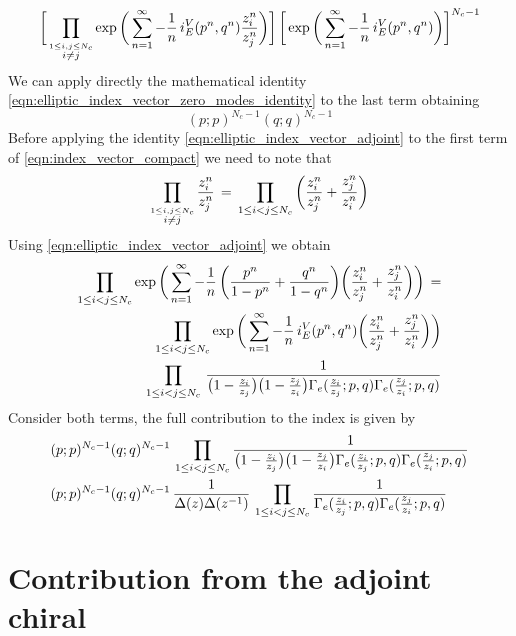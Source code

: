 \begin{appendices}
\begin{equation}
\bigg[\prod_{\overset{ 1 \leq i,j \leq N_c}{i\neq j}} \exp \bigg( \sum_{n=1}^{\infty} - {1 \over n} \, i_E^V(p^n,q^n)  {z_i^n \over z_j^n}\bigg) \bigg] \,
\bigg[ \exp \bigg( \sum_{n=1}^{\infty} - {1 \over n} \,  i_E^V(p^n,q^n) \bigg) \bigg] ^{N_c-1}
\label{eqn:index_vector_compact}
\end{equation}
We can apply directly the mathematical identity \eqref{eqn:elliptic_index_vector_zero_modes_identity} to the last term obtaining
$$
	(p;p)^{N_c-1} ( q;q)^{N_c-1}
$$
Before applying the identity \eqref{eqn:elliptic_index_vector_adjoint} to the first term of  \eqref{eqn:index_vector_compact} we need to note that 
$$
 \prod_{ \overset{ 1 \leq i,j \leq N_c}{ i\neq j }} {z_i^n \over z_j^n} \,  = \,
  \prod_{ 1 \leq i < j \leq N_c}\bigg( {z_i^n \over z_j^n} + {z_j^n \over z_i^n}   \bigg)
 $$
Using \eqref{eqn:elliptic_index_vector_adjoint} we obtain
\begin{align*}
\prod_{ 1 \leq i < j \leq N_c} \exp \bigg( \sum_{n=1}^{\infty} - {1 \over n} \, \bigg( {p^n \over 1-p^n} + {q^n \over 1-q^n} \bigg)  \bigg( {z_i^n \over z_j^n} + {z_j^n \over z_i^n}\bigg) \bigg) \, =\\
\prod_{ 1 \leq i < j \leq N_c} \exp \bigg( \sum_{n=1}^{\infty} - {1 \over n} \, i_E^V(p^n,q^n)  \bigg( {z_i^n \over z_j^n} + {z_j^n \over z_i^n}\bigg) \bigg)
\\
 \prod_{ 1 \leq i < j \leq N_c}   \, \frac{ 1 } { \big( 1 -{ z_i \over z_j} \big) \big ( 1 - { z_j \over z_i} \big) \Gamma_e( {z_i \over z_j};p,q) \Gamma_e({z_j \over z_i}; p,q)  }
\end{align*}
Consider both terms, the full contribution to the index is given by  \begin{align*}
& (p;p)^{N_c-1} ( q;q)^{N_c-1} \, \prod_{ 1 \leq i < j \leq N_c} \frac{ 1 }{ \big( 1 -{ z_i \over z_j} \big) \big ( 1 - { z_j \over z_i} \big) \Gamma_e( {z_i \over z_j};p,q) \Gamma_e({z_j \over z_i}; p,q)  } \\
& (p;p)^{N_c-1} ( q;q)^{N_c-1} \, \frac{1}{ \Delta(z) \Delta (z^{-1})} \, \prod_{ 1 \leq i < j \leq N_c} \frac{ 1 }{ \Gamma_e( {z_i \over z_j};p,q) \Gamma_e({z_j \over z_i}; p,q)}
\end{align*}

\section{Contribution from the adjoint chiral}




\end{appendices}